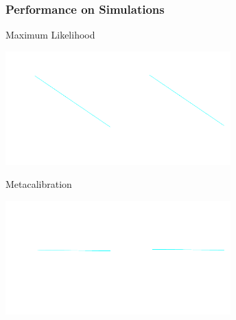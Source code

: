 \documentclass{beamer}
\begin{document}
\frame
{
    \frametitle{Performance on Simulations}
 
    {\normalsize Maximum Likelihood}
    \begin{center}
        \includegraphics[width=0.65\textwidth]{run-bd29mcal01-fit-m-c-nocorr-icolor.pdf}
    \end{center}

    {\normalsize Metacalibration}
    \begin{center}
        \includegraphics[width=0.65\textwidth]{run-bd29mcal01-fit-m-c-icolor.pdf}
    \end{center}

}
\end{document}
